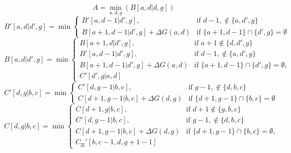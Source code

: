 \documentclass{article}
\begin{document}
$$ A =\min_{ a,d,g } \left( B\left[a,d|d,g\right]\right) $$
$$ B' \left[a,d | d',g \right] =  \min\begin{cases}B'[ a , d-1|d',g ], &\text{if } d-1 ,\notin\{ a , d',g \} \\B[ a+1 , d-1|d',g ]+\Delta G(a,d) &\text{if } \{ a+1 , d-1 \}\cap \{ d',g \}=\emptyset\end{cases}$$
$$ B \left[a,d | d',g \right] =  \min\begin{cases}B[ a+1 , d|d',g ], &\text{if } a+1 \notin\{ d , d',g \} \\B'[ a , d-1|d',g ], &\text{if } d-1 ,\notin\{ a , d',g \} \\B[ a+1 , d-1|d',g ]+\Delta G(a,d) &\text{if } \{ a+1 , d-1 \}\cap \{ d',g \}=\emptyset,\\C'[d',g|a,d]\end{cases}$$
$$ C' \left[d,g | b,c \right] =  \min\begin{cases}C'[ d , g-1|b,c ], &\text{if } g-1 ,\notin\{ d , b,c \} \\C[ d+1 , g-1|b,c ]+\Delta G(d,g) &\text{if } \{ d+1 , g-1 \}\cap \{ b,c \}=\emptyset\end{cases}$$
$$ C \left[d,g | b,c \right] =  \min\begin{cases}C[ d+1 , g|b,c ], &\text{if } d+1 \notin\{ g , b,c \} \\C'[ d , g-1|b,c ], &\text{if } g-1 ,\notin\{ d , b,c \} \\C[ d+1 , g-1|b,c ]+\Delta G(d,g) &\text{if } \{ d+1 , g-1 \}\cap \{ b,c \}=\emptyset,\\C_{\boxtimes}'[b,c-1,d,g+1-1]\end{cases}$$
\end{document}
